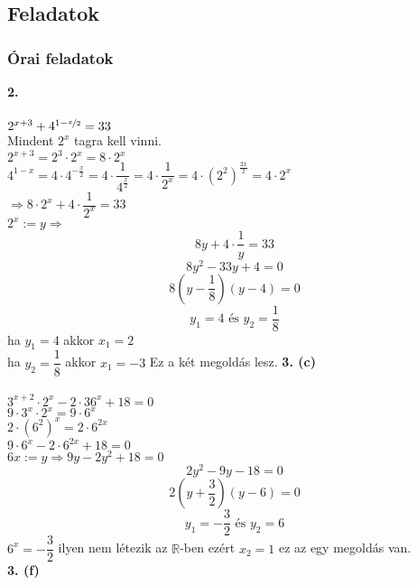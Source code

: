\documentclass[12pt,a4paper,fleqn]{article}
\begin{document}
\subsection{Feladatok}
\subsubsection{Órai feladatok}
\textbf{2.} \\\\
$2^{x+3} + 4^{1-\nicefrac{x}{2}} = 33$ \\
Mindent $2^x$ tagra kell vinni. \\
$2^{x+3} = 2^3 \cdot 2^x = 8 \cdot 2^x$ \\
$4^{1-x} = 4 \cdot 4^{-\frac{x}{2}} = 4 \cdot \dfrac{1}{4^{\frac{x}{2}}} = 4 \cdot \dfrac{1}{2^x} = 4 \cdot (2^2)^{\frac{2x}{2}} = 4 \cdot 2^x$ \\
$\Rightarrow 8 \cdot 2^x + 4 \cdot \dfrac{1}{2^x} = 33$ \\
$2^x := y \Rightarrow$ \\
$$8y + 4 \cdot \dfrac{1}{y} = 33$$
$$ 8y^2 - 33y + 4 = 0 $$
$$ 8(y-\dfrac{1}{8})(y-4) =0 $$
$$ y_1 = 4 \text{ és } y_2 = \dfrac{1}{8} $$
ha $y_1 = 4$ akkor $x_1 = 2$ \\
ha $y_2 = \dfrac{1}{8}$ akkor $x_1 = -3$
Ez a két megoldás lesz.
\textbf{3. (c)} \\\\
$ 3^{x+2} \cdot 2^x - 2 \cdot 36^x + 18 = 0$ \\
$ 9 \cdot 3^x \cdot 2^x = 9 \cdot 6^x $ \\
$ 2 \cdot (6^2)^x= 2 \cdot 6^{2x}$ \\
$ 9 \cdot 6^x - 2 \cdot 6^{2x} + 18 = 0 $ \\
$ 6x := y \Rightarrow 9y - 2y^2 + 18 = 0 $ \\
$$ 2y^2 - 9y - 18 = 0 $$
$$ 2(y+\dfrac{3}{2})(y-6) = 0 $$
$$ y_1=-\dfrac{3}{2} \text{ és } y_2 = 6$$
$ 6^x = -\dfrac{3}{2}$ ilyen nem létezik az $\mathbb{R}$-ben ezért $ x_2 = 1 $ ez az egy megoldás van. \\
\textbf{3. (f)} \\\\
\end{document}
